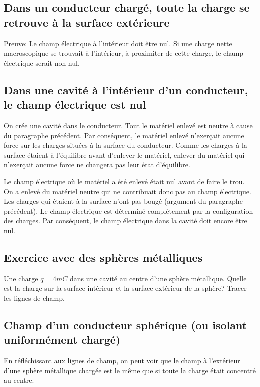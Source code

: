 \subsection*{Dans un conducteur chargé, toute la charge se retrouve à la surface
  extérieure}

Preuve: Le champ électrique à l'intérieur doit être nul. Si une charge nette
macroscopique se trouvait à l'intérieur, à proximiter de cette charge, le champ
électrique serait non-nul.



\subsection*{Dans une cavité à l'intérieur d'un conducteur, le champ électrique est
  nul}

On crée une cavité dans le conducteur. Tout le matériel enlevé est
neutre à cause du paragraphe précédent. Par conséquent, le matériel enlevé
n'exerçait aucune force sur les charges situées à la surface du conducteur.
Comme les charges à la surface étaient à l'équilibre avant d'enlever le
matériel, enlever du matériel qui n'exerçait aucune force ne changera pas leur
état d'équilibre.

Le champ électrique où le matériel a été enlevé était nul avant de faire le
trou. On a enlevé du matériel neutre qui ne contribuait donc pas au champ
électrique. Les charges qui étaient à la surface n'ont pas bougé (argument du
paragraphe précédent). Le champ électrique est déterminé complètement par la
configuration des charges. Par conséquent, le champ électrique dans la cavité
doit encore être nul.


\subsection*{Exercice avec des sphères métalliques}

Une charge $q = \si{4}{mC}$ dans une cavité au centre d'une sphère métallique.
Quelle est la charge sur la surface intérieur et la surface extérieur de la
sphère? Tracer les lignes de champ.


\subsection*{Champ d'un conducteur sphérique (ou isolant uniformément chargé)}

En réfléchissant aux lignes de champ, on peut voir que le champ à l'extérieur
d'une sphère métallique chargée est le même que si toute la charge était
concentré au centre.



